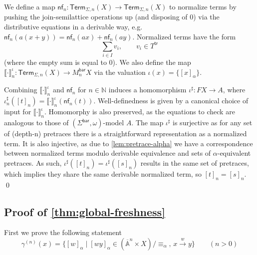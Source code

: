 \documentclass[11pt,a4paper]{amsart}
\newcommand{\Br}{\mathsf{bar}}
\newcommand{\trc}{\mathsf{tr}}
\newcommand{\pre}{\mathsf{pre}}
\newcommand{\abs}{\mathsf{abs}}
\newcommand{\Term}{\mathsf{Term}}
\newcommand{\Names}{\mathbb{A}}
\newcommand{\barNames}{\overline{\Names}}
\newcommand{\alphaeq}{\equiv_\alpha}
\theoremstyle{plain}
\newcommand{\midmid}{\hspace{0.2ex}{\rule[-0.1ex]{0.6pt}{1.65ex}}\hspace{0.2ex}}
\newcommand{\newletter}[1]{{\midmid}#1}
\numberwithin{equation}{section}
\newcommand{\sem}[1]{\llbracket #1 \rrbracket}
\newcommand{\Nat}{{\mathbb{N}}}
\newcommand{\+}[1]{\mathcal{#1}\xspace}
\theoremstyle{definition}
\begin{document}
We define a map $\mathsf{nf}_n \colon \Term_{\Sigma,n}(X) \to \Term_{\Sigma,n}(X)$ to normalize terms by pushing the join-semilattice operations up (and disposing of $0$) via the distributive equations in a derivable way, e.g. $\mathsf{nf}_n(a(x + y)) = \mathsf{nf}_n(ax) + \mathsf{nf}_n(ay)$. Normalized terms have the form
\[\sum_{i \in I} v_i, \qquad v_i \in T^\trc \] (where the empty sum is equal to $0$).
We also define the map $\sem{\cdot}^\iota_n \colon \Term_{\Sigma,n}(X) \to M^\Br_n X$ via the valuation $\iota(x) = \{[x]_\alpha\}$.

Combining $\sem{\cdot}^\iota_n$ and $\mathsf{nf}_n$ for $n \in \Nat$ induces a homomorphism $\iota^\sharp\colon FX \to A$, where $\iota^\sharp_n([t]_n) = \sem{\cdot}^\iota_n(\mathsf{nf}_n(t))$.
Well-definedness is given by a canonical choice of input for $\sem{\cdot}^\iota_n$. Homomorphy is also preserved, as the equations to check are analogous to those of $(\Sigma^\Br, \omega)$-model $A$. The map $\iota^\sharp$ is surjective as for any set of (depth-n) pretraces there is a straightforward representation as a normalized term. It is also injective, as due to \cref{lem:pretrace-alpha} we have a correspondence between normalized terms modulo derivable equivalence and sets of $\alpha$-equivalent pretraces. As such, $\iota^\sharp([t]_n) = \iota^\sharp([s]_n)$ results in the same set of pretraces, which implies they share the same derivable normalized term, so $[t]_n = [s]_n$.
\qed

\subsection*{Proof of \cref{thm:global-freshness}}

First we prove the following statement
\begin{equation*}
    \gamma^{(n)}(x) = \{[w]_\alpha \mid [wy]_\alpha \in (\barNames^n\times X) / {\alphaeq}, \, x \xrightarrow{w} y\} \qquad (n > 0)
\end{equation*}
\end{document}

